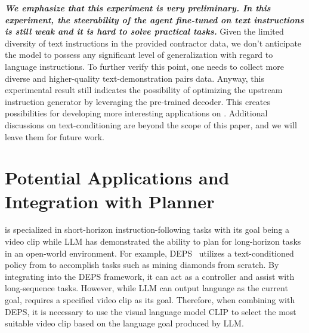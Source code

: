 \documentclass[11pt, a4paper, logo, one column]{craftjarvis}
\begin{document}
\emph{\textbf{We emphasize that this experiment is very preliminary. In this experiment, the steerability of the agent fine-tuned on text instructions is still weak and it is hard to solve practical tasks.}} Given the limited diversity of text instructions in the provided contractor data, we don't anticipate the model to possess any significant level of generalization with regard to language instructions. To further verify this point, one needs to collect more diverse and higher-quality text-demonstration pairs data. Anyway, this experimental result still indicates the possibility of optimizing the upstream instruction generator by leveraging the pre-trained decoder. This creates possibilities for developing more interesting applications on \agent. Additional discussions on text-conditioning are beyond the scope of this paper, and we will leave them for future work. 

\begin{table}[t]
\footnotesize
\caption{\textbf{Text conditioning results on resource collection tasks.} Each episode lasts 30 seconds (600 frames). Statistics are measured over 10 episodes. The term "baseline" refers to the model before being fine-tuned, while "fine-tuned" refers to the final model after fine-tuning. } \label{tab:text_condition}
\renewcommand\arraystretch{1.1}
\end{table}

\section{Potential Applications and Integration with Planner}
\agent is specialized in short-horizon instruction-following tasks with its goal being a video clip while LLM has demonstrated the ability to plan for long-horizon tasks in an open-world environment. For example, DEPS~\cite{deps} utilizes a text-conditioned policy from \cite{worldmc} to accomplish tasks such as mining diamonds from scratch. By integrating \agent into the DEPS framework, it can act as a controller and assist with long-sequence tasks. However, while LLM can output language as the current goal, \agent requires a specified video clip as its goal. Therefore, when combining \agent with DEPS, it is necessary to use the visual language model CLIP to select the most suitable video clip based on the language goal produced by LLM. 
\end{document}

